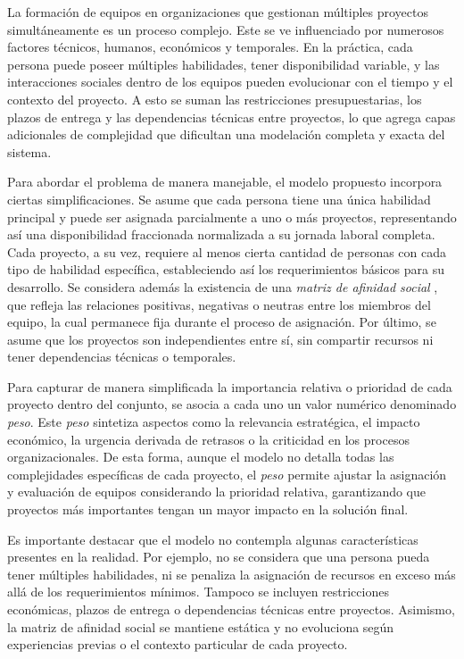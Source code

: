 \documentclass[conference]{IEEEtran}
\begin{document}
La formación de equipos en organizaciones que gestionan múltiples proyectos simultáneamente es un proceso complejo. Este se ve influenciado por numerosos factores técnicos, humanos, económicos y temporales. En la práctica, cada persona puede poseer múltiples habilidades, tener disponibilidad variable, y las interacciones sociales dentro de los equipos pueden evolucionar con el tiempo y el contexto del proyecto. A esto se suman las restricciones presupuestarias, los plazos de entrega y las dependencias técnicas entre proyectos, lo que agrega capas adicionales de complejidad que dificultan una modelación completa y exacta del sistema.

Para abordar el problema de manera manejable, el modelo propuesto incorpora ciertas simplificaciones. Se asume que cada persona tiene una única habilidad principal y puede ser asignada parcialmente a uno o más proyectos, representando así una disponibilidad fraccionada normalizada a su jornada laboral completa. Cada proyecto, a su vez, requiere al menos cierta cantidad de personas con cada tipo de habilidad específica, estableciendo así los requerimientos básicos para su desarrollo. Se considera además la existencia de una \textit{matriz de afinidad social} \cite{gutierrez2016multiple}, que refleja las relaciones positivas, negativas o neutras entre los miembros del equipo, la cual permanece fija durante el proceso de asignación. Por último, se asume que los proyectos son independientes entre sí, sin compartir recursos ni tener dependencias técnicas o temporales.

Para capturar de manera simplificada la importancia relativa o prioridad de cada proyecto dentro del conjunto, se asocia a cada uno un valor numérico denominado \textit{peso}. Este \textit{peso} sintetiza aspectos como la relevancia estratégica, el impacto económico, la urgencia derivada de retrasos o la criticidad en los procesos organizacionales. De esta forma, aunque el modelo no detalla todas las complejidades específicas de cada proyecto, el \textit{peso} permite ajustar la asignación y evaluación de equipos considerando la prioridad relativa, garantizando que proyectos más importantes tengan un mayor impacto en la solución final.

Es importante destacar que el modelo no contempla algunas características presentes en la realidad. Por ejemplo, no se considera que una persona pueda tener múltiples habilidades, ni se penaliza la asignación de recursos en exceso más allá de los requerimientos mínimos. Tampoco se incluyen restricciones económicas, plazos de entrega o dependencias técnicas entre proyectos. Asimismo, la matriz de afinidad social se mantiene estática y no evoluciona según experiencias previas o el contexto particular de cada proyecto.
\end{document}
